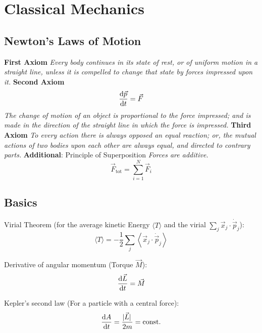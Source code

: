\section{Classical Mechanics}
	\subsection{Newton's Laws of Motion}
		\textbf{First Axiom} \newline
			\indent \textit{Every body continues in its state of rest, or of uniform motion in a straight line, unless it is compelled to change that state by forces impressed upon it.} \nl
		\textbf{Second Axiom}
			\begin{equation}
				\dv{\vec{p}}{t} = \vec{F}
			\end{equation}
			\indent \textit{The change of motion of an object is proportional to the force impressed; and is made in the direction of the straight line in which the force is impressed.}\nl
		\textbf{Third Axiom} \newline 
			\indent \textit{To every action there is always opposed an equal reaction; or, the mutual actions of two bodies upon each other are always equal, and directed to contrary parts.} \nl
		\textbf{Additional}: Principle of Superposition \newline
			\indent \textit{Forces are additive.}
			\begin{equation}
				\vec{F}_{\mathrm{tot}} = \sum_{i=1}^{N} \vec{F}_i
			\end{equation}

	\subsection{Basics}
		\noindent
		Virial Theorem (for the average kinetic Energy $\langle T \rangle$ and the virial $\sum_j \vec{x}_j\cdot\dot{\vec{p}}_j$):
		\begin{equation}
			\langle T \rangle = - \frac{1}{2} \sum_j \left\langle \vec{x}_j\cdot\dot{\vec{p}}_j \right\rangle
		\end{equation}

		\noindent
		Derivative of angular momentum (Torque $\vec{M}$):
		\begin{equation}
			\dv{\vec{L}}{t} = \vec{M}
		\end{equation}

		\noindent
		Kepler's second law (For a particle with a central force):
		\begin{equation}
			\dv{A}{t} = \frac{\abs*{\vec{L}}}{2 m} = \mathrm{const.}
		\end{equation}

